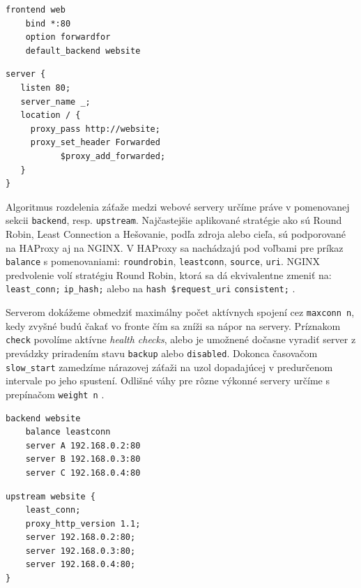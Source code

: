 \documentclass[12pt, a4paper]{article}
\begin{document}
\noindent\begin{minipage}{.48\textwidth}
\begin{lstlisting}[caption=HAProxy: preposielanie požiadavok na pool serverov za reverznou proxy]
frontend web
    bind *:80
    option forwardfor
    default_backend website
\end{lstlisting}
\end{minipage}\hfill
\begin{minipage}{.48\textwidth}
\begin{lstlisting}[caption=NGINX: preposielanie požiadavok na pool serverov za reverznou proxy]
server {
   listen 80;
   server_name _;
   location / { 
     proxy_pass http://website;
     proxy_set_header Forwarded 
           $proxy_add_forwarded;
   }
}
\end{lstlisting}
\end{minipage}

Algoritmus rozdelenia záťaže medzi webové servery určíme práve v pomenovanej sekcii \verb|backend|, resp.
\verb|upstream|. Najčastejšie aplikované stratégie ako sú Round Robin, Least Connection a Hešovanie, podľa 
zdroja alebo cieľa, sú podporované na HAProxy aj na NGINX. V HAProxy sa nachádzajú pod voľbami pre príkaz 
\verb|balance| s pomenovaniami: \verb|roundrobin|, \verb|leastconn|, \verb|source|, \verb|uri|.
\cite{haproxy-docs} NGINX predvolenie volí stratégiu Round Robin, ktorá sa dá ekvivalentne zmeniť na: 
\verb|least_conn;| \verb|ip_hash;| alebo na \verb|hash $request_uri| \verb|consistent;| 
\cite{nginx-http-balancer}.

Serverom dokážeme obmedziť maximálny počet aktívnych spojení cez \verb|maxconn n|, kedy zvyšné budú čakať
vo fronte čím sa zníži sa nápor na servery. Príznakom \verb|check| povolíme
aktívne \emph{health checks}, alebo je umožnené dočasne vyradiť server z prevádzky priradením 
stavu \verb|backup| alebo \verb|disabled|. Dokonca časovačom \verb|slow_start| zamedzíme nárazovej záťaži
na uzol dopadajúcej v predurčenom intervale po jeho spustení.  Odlišné váhy pre rôzne výkonné servery 
určíme s prepínačom \verb|weight n| \cite{haproxy-docs}.

\noindent\begin{minipage}{.48\textwidth}
\begin{lstlisting}[caption=HAProxy:  vyvažovanie záťaže najmenej spojení na trojicu HTTP serverov]
backend website
    balance leastconn
    server A 192.168.0.2:80
    server B 192.168.0.3:80
    server C 192.168.0.4:80
\end{lstlisting}
\end{minipage}\hfill
\begin{minipage}{.48\textwidth}
\begin{lstlisting}[caption=NGINX: vyvažovanie záťaže najmenej spojení na trojicu HTTP serverov]
upstream website {
    least_conn;
    proxy_http_version 1.1;
    server 192.168.0.2:80;
    server 192.168.0.3:80;
    server 192.168.0.4:80;
}
\end{lstlisting}
\end{minipage}
\end{document}
